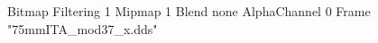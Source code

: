 {Bitmap
	{Filtering 1}
	{Mipmap 1}
	{Blend none}
	{AlphaChannel 0}
	{Frame "75mmITA_mod37_x.dds"}
}
